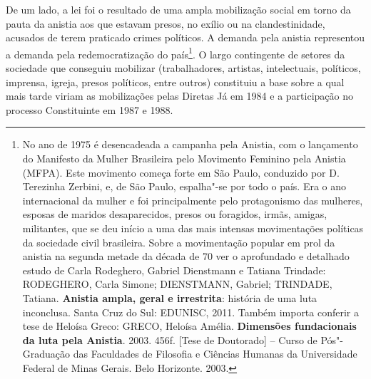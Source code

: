 De um lado, a lei foi o resultado de uma ampla mobilização social em
torno da pauta da anistia aos que estavam presos, no exílio ou na
clandestinidade, acusados de terem praticado crimes políticos. A demanda
pela anistia representou a demanda pela redemocratização do
país\footnote{No ano de 1975 é desencadeada a campanha pela Anistia, com
  o lançamento do Manifesto da Mulher Brasileira pelo Movimento Feminino
  pela Anistia (MFPA). Este movimento começa forte em São Paulo,
  conduzido por D. Terezinha Zerbini, e, de São Paulo, espalha"-se por
  todo o país. Era o ano internacional da mulher e foi principalmente
  pelo protagonismo das mulheres, esposas de maridos desaparecidos,
  presos ou foragidos, irmãs, amigas, militantes, que se deu início a
  uma das mais intensas movimentações políticas da sociedade civil
  brasileira. Sobre a movimentação popular em prol da anistia na segunda
  metade da década de 70 ver o aprofundado e detalhado estudo de Carla
  Rodeghero, Gabriel Dienstmann e Tatiana Trindade: RODEGHERO, Carla
  Simone; DIENSTMANN, Gabriel; TRINDADE, Tatiana. \textbf{Anistia ampla,
  geral e irrestrita}: história de uma luta inconclusa. Santa Cruz do
  Sul: EDUNISC, 2011. Também importa conferir a tese de Heloísa Greco:
  GRECO, Heloísa Amélia. \textbf{Dimensões fundacionais da luta pela
  Anistia}. 2003. 456f. {[}Tese de Doutorado{]} -- Curso de
  Pós"-Graduação das Faculdades de Filosofia e Ciências Humanas da
  Universidade Federal de Minas Gerais. Belo Horizonte. 2003.}. O largo
contingente de setores da sociedade que conseguiu mobilizar
(trabalhadores, artistas, intelectuais, políticos, imprensa, igreja,
presos políticos, entre outros) constituiu a base sobre a qual mais
tarde viriam as mobilizações pelas Diretas Já em 1984 e a participação
no processo Constituinte em 1987 e 1988.

